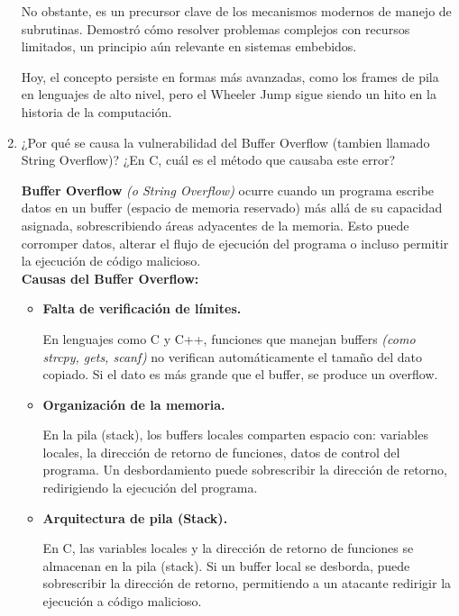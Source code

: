 \documentclass[12pt,letterpaper]{article}
\begin{document}
\begin{enumerate}
  No obstante, es un precursor clave de los mecanismos modernos de manejo de subrutinas. Demostró cómo resolver problemas complejos con recursos limitados, un principio aún relevante en sistemas embebidos.

  Hoy, el concepto persiste en formas más avanzadas, como los frames de pila en lenguajes de alto nivel, pero el Wheeler Jump sigue siendo un hito en la historia de la computación.

  \bigskip
  
\item ¿Por qué se causa la vulnerabilidad del Buffer Overflow (tambien llamado String Overflow)? ¿En C, cuál es el método que causaba este error?

  \textbf{Buffer Overflow} \textit{(o String Overflow)} ocurre cuando un programa escribe datos en un buffer (espacio de memoria reservado) más allá de su capacidad asignada, sobrescribiendo áreas adyacentes de la memoria. Esto puede corromper datos, alterar el flujo de ejecución del programa o incluso permitir la ejecución de código malicioso.\\
  
  \textbf{Causas del Buffer Overflow:}

  \begin{itemize}
  \item \textbf{Falta de verificación de límites.}
    
    En lenguajes como C y C++, funciones que manejan buffers \textit{(como strcpy, gets, scanf)} no verifican automáticamente el tamaño del dato copiado. Si el dato es más grande que el buffer, se produce un overflow.
    
  \item \textbf{Organización de la memoria.}

    En la pila (stack), los buffers locales comparten espacio con: variables locales, la dirección de retorno de funciones, datos de control del programa. Un desbordamiento puede sobrescribir la dirección de retorno, redirigiendo la ejecución del programa.
    
  \item \textbf{Arquitectura de pila (Stack).}
    
    En C, las variables locales y la dirección de retorno de funciones se almacenan en la pila (stack). Si un buffer local se desborda, puede sobrescribir la dirección de retorno, permitiendo a un atacante redirigir la ejecución a código malicioso.

  \end{itemize}
  

\end{enumerate}
\end{document}

